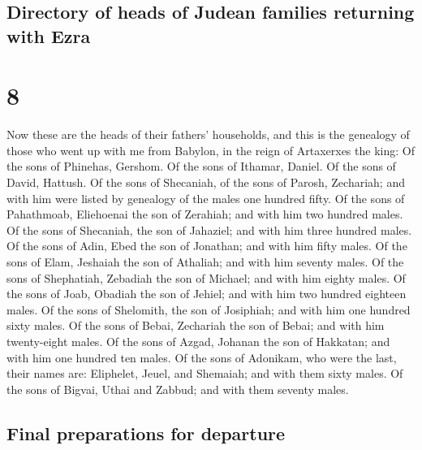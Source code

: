 \begin{paracol}{2}
\switchcolumn
\begin{otherlanguage}{english}

\hypertarget{directory-of-heads-of-judean-families-returning-with-ezra}{%
\subsection{Directory of heads of Judean families returning with
Ezra}\label{directory-of-heads-of-judean-families-returning-with-ezra}}

\hypertarget{section-15}{%
\section{8}\label{section-15}}

 Now these are the heads of their fathers' households, and
this is the genealogy of those who went up with me from Babylon, in the
reign of Artaxerxes the king:  Of the sons of Phinehas,
Gershom. Of the sons of Ithamar, Daniel. Of the sons of David, Hattush.
 Of the sons of Shecaniah, of the sons of Parosh,
Zechariah; and with him were listed by genealogy of the males one
hundred fifty.  Of the sons of Pahathmoab, Eliehoenai the
son of Zerahiah; and with him two hundred males.  Of the
sons of Shecaniah, the son of Jahaziel; and with him three hundred
males.  Of the sons of Adin, Ebed the son of Jonathan; and
with him fifty males.  Of the sons of Elam, Jeshaiah the
son of Athaliah; and with him seventy males.  Of the sons
of Shephatiah, Zebadiah the son of Michael; and with him eighty males.
 Of the sons of Joab, Obadiah the son of Jehiel; and with
him two hundred eighteen males.  Of the sons of
Shelomith, the son of Josiphiah; and with him one hundred sixty males.
 Of the sons of Bebai, Zechariah the son of Bebai; and
with him twenty-eight males.  Of the sons of Azgad,
Johanan the son of Hakkatan; and with him one hundred ten males.
 Of the sons of Adonikam, who were the last, their names
are: Eliphelet, Jeuel, and Shemaiah; and with them sixty males.
 Of the sons of Bigvai, Uthai and Zabbud; and with them
seventy males.

\hypertarget{final-preparations-for-departure}{%
\subsection{Final preparations for
departure}\label{final-preparations-for-departure}}


\end{otherlanguage}
\end{paracol}
